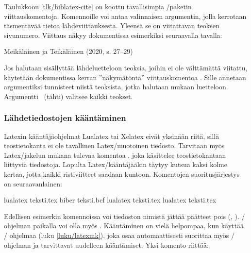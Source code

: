 Taulukkoon \ref{tlk/biblatex-cite} on koottu tavallisimpia
\-/paketin viittauskomentoja. Komennoille voi antaa
valinnaisen argumentin, jolla kerrotaan täsmentävää tietoa
lähdeviittauksesta. Yleensä se on viitattavan teoksen sivunumero.
Viittaus näkyy dokumentissa esimerkiksi seuraavalla tavalla:

\begin{koodilohkosis}
\textcite[27--29]{johdatus} %
\end{koodilohkosis}

\begin{tulossis}
  Meikäläinen ja Teikäläinen (2020, s. 27--29)
\end{tulossis}

\noindent
Jos halutaan sisällyttää lähdeluetteloon teoksia, joihin ei ole
välttämättä viitattu, käytetään dokumentissa kerran ''näkymätöntä''
viittauskomentoa . Sille annetaan argumentiksi
tunnisteet niistä teoksista, jotka halutaan mukaan luetteloon.
Argumentti~\koodi{*} (tähti) valitsee kaikki teokset.

\begin{koodilohkosis}
\nocite{meikäläinen, teikäläinen} %
\nocite{*}                        %
\end{koodilohkosis}

\subsubsection{Lähdetiedostojen kääntäminen}

Latexin kääntäjäohjelmat Lualatex tai Xelatex eivät yksinään riitä,
sillä teostietokanta ei ole tavallinen Latex\-/muotoinen tiedosto.
Tarvitaan myös Latex\-/jakelun mukana tulevaa komentoa ,
joka käsittelee teostietokantaan liittyviä tiedostoja. Lopulta
Latex\-/kääntäjääkin täytyy kutsua kaksi kolme kertaa, jotta kaikki
ristiviitteet saadaan kuntoon. Komentojen suoritusjärjestys on
seuraavanlainen:

\begin{koodilohkosis}
lualatex teksti.tex
biber teksti.bcf
lualatex teksti.tex
lualatex teksti.tex
\end{koodilohkosis}

\noindent
Edellisen esimerkin komennoissa voi tiedoston nimistä jättää päätteet
pois (, ). \-/ ohjelman paikalla
voi olla myös . Kääntäminen on vielä helpompaa, kun
käyttää \-/ ohjelmaa (luku \ref{luku/latexmk}), joka osaa
automaattisesti suorittaa myös \-/ ohjelman ja tarvittavat
uudelleen kääntämiset. Yksi komento riittää:

